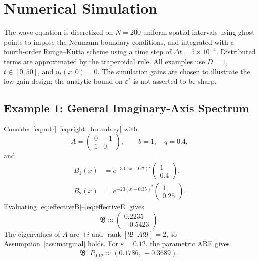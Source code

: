 \documentclass{IEEEtran}
\theoremstyle{definition}
\begin{document}
\section{Numerical Simulation}
\label{sec:num}
The wave equation is discretized on $N=200$ uniform spatial intervals
using ghost points to impose the Neumann boundary conditions, and integrated
with a fourth-order Runge--Kutta scheme using a time step of
$\Delta t=5\times10^{-4}$. Distributed terms are approximated by the
trapezoidal rule. All examples use $D=1$, $t\in[0,50]$, and
$u_t(x,0)=0$. The simulation gains are chosen to illustrate the low-gain
design; the analytic bound on $\varepsilon^*$ is not asserted to be sharp.

\subsection{Example 1: General Imaginary-Axis Spectrum}
\label{ex1}
Consider \eqref{eq:ode}--\eqref{eq:right_boundary} with
\begin{equation}
 A=\begin{pmatrix}0&-1\\1&0\end{pmatrix},
 \qquad b=1,\quad q=0.4,
\label{eq:ex1A}
\end{equation}
and
\begin{equation}
\begin{aligned}
 B_1(x)&=e^{-30(x-0.7)^2}\begin{pmatrix}1\\0.4\end{pmatrix},\\
 B_2(x)&=e^{-20(x-0.35)^2}\begin{pmatrix}1\\0.25\end{pmatrix}.
\end{aligned}
\label{eq:ex1B}
\end{equation}
Evaluating \eqref{eq:effectiveB}--\eqref{eq:effectiveE} gives
\begin{equation}
 \mathfrak B\approx\begin{pmatrix}0.2235\\-0.5423\end{pmatrix}.
\label{eq:ex1Bgain}
\end{equation}
The eigenvalues of $A$ are $\pm i$ and
$\operatorname{rank}[\mathfrak B\ \ A\mathfrak B]=2$, so Assumption~\ref{ass:marginal} holds.
For $\varepsilon=0.12$, the parametric ARE gives
\begin{equation}
 \mathfrak B^\top P_{0.12}\approx(0.1786,\,-0.3689),
\label{eq:ex1K}
\end{equation}
\end{document}
